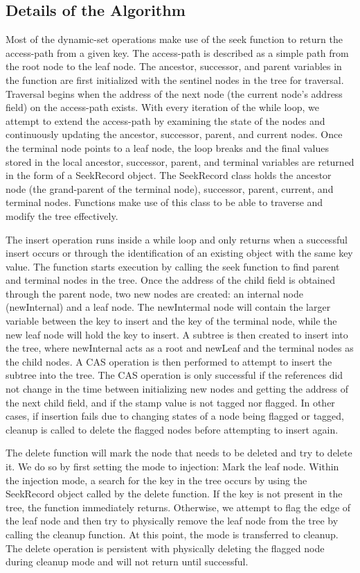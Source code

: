 \documentclass[conference]{IEEEtran}
\begin{document}
\subsection{Details of the Algorithm}
 Most of the dynamic-set operations make use of the seek function to return the access-path from a given key. The access-path is described as a simple path from the root node to the leaf node. The ancestor, successor, and parent variables in the function are first initialized with the sentinel nodes in the tree for traversal. Traversal begins when the address of the next node (the current node’s address field) on the access-path exists. With every iteration of the while loop, we attempt to extend the access-path by examining the state of the nodes and continuously updating the ancestor, successor, parent, and current nodes. Once the terminal node points to a leaf node, the loop breaks and the final values stored in the local ancestor, successor, parent, and terminal variables are returned in the form of a SeekRecord object. The SeekRecord class holds the ancestor node (the grand-parent of the terminal node), successor, parent, current, and terminal nodes. Functions make use of this class to be able to traverse and modify the tree effectively.

The insert operation runs inside a while loop and only returns when a successful insert occurs or through the identification of an existing object with the same key value. The function starts execution by calling the seek function to find parent and terminal nodes in the tree. Once the address of the child field is obtained through the parent node, two new nodes are created: an internal node (newInternal) and a leaf node. The newIntermal node will contain the larger variable between the key to insert and the key of the terminal node, while the new leaf node will hold the key to insert. A subtree is then created to insert into the tree, where newInternal acts as a root and newLeaf and the terminal nodes as the child nodes. A CAS operation is then performed to attempt to insert the subtree into the tree. The CAS operation is only successful if the references did not change in the time between initializing new nodes and getting the address of the next child field, and if the stamp value is not tagged nor flagged. In other cases, if insertion fails due to changing states of a node being flagged or tagged, cleanup is called to delete the flagged nodes before attempting to insert again. 

The delete function will mark the node that needs to be deleted and try to delete it. We do so by first setting the mode to injection: Mark the leaf node. Within the injection mode, a search for the key in the tree occurs by using the SeekRecord object called by the delete function. If the key is not present in the tree, the function immediately returns. Otherwise, we attempt to flag the edge of the leaf node and then try to physically remove the leaf node from the tree by calling the cleanup function. At this point, the mode is transferred to cleanup. The delete operation is persistent with physically deleting the flagged node during cleanup mode and will not return until successful.
\end{document}
